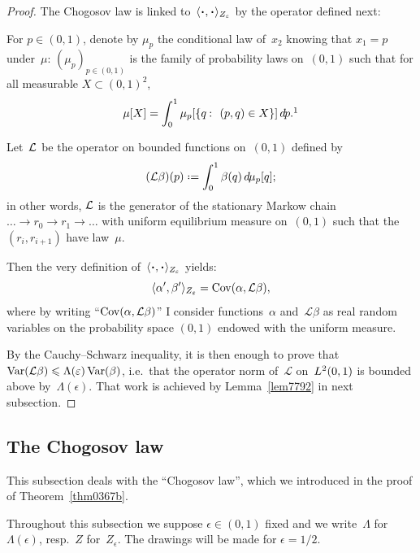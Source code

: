 \begin{proof}
The Chogosov law is linked to~$\langle\Bcdot,\Bcdot\rangle_{Z_{\epsilon}}$ by the operator defined next:
%
\begin{Def}
For $p\in(0,1)$, denote by $\mu_p$ the conditional law of~$x_2$ knowing that $x_1=p$ under~$\mu$:
$(\mu_p)_{p\in(0,1)}$ is the family of probability laws on~$(0,1)$ such that for all measurable $X\subset(0,1)^2$,
\[ \mu[X] = \int_0^1 \mu_p [\{q\colon (p,q)\in X\}] \,\dx{p} .\footnotemark\]
\end{Def}
%
\begin{Def}
Let~$\mathcal{L}$ be the operator on bounded functions on~$(0,1)$ defined by
\[ (\mcal{L}\beta)(p) \coloneqq \int_0^1 \beta(q) \,\dx{\mu_p}[q] ;\]
in other words, $\mathcal{L}$ is the generator of the stationary Markow chain
$\ldots \to r_0 \to r_1 \to \ldots$ with uniform equilibrium measure on~$(0,1)$
such that the $(r_i,r_{i+1})$ have law~$\mu$.
\end{Def}
%
\noindent Then the very definition of~$\langle\Bcdot,\Bcdot\rangle_{Z_{\epsilon}}$ yields:
\[ \langle\alpha',\beta'\rangle_{Z_{\varepsilon}} = \operatorname{Cov}(\alpha,\mathcal{L}\beta) ,\]
%
where by writing ``$\operatorname{Cov}(\alpha,\mathcal{L}\beta)$'' I consider
functions~$\alpha$ and~$\mathcal{L}\beta$ as real random variables
on the probability space $(0,1)$ endowed with the uniform measure.

By the Cauchy--Schwarz inequality,
it is then enough to prove that $\operatorname{Var}(\mathcal{L}\beta) \leqslant \Lambda(\varepsilon)\operatorname{Var}(\beta)$,
i.e.\ that the operator norm of~$\mathcal{L}$ on~$\ldb(0,1)$ is bounded above by~$\Lambda(\epsilon)$.
That work is achieved by Lemma~\ref{lem7792} in next subsection.
\end{proof}


\subsection{The Chogosov law}\label{parTheChogosovProcess}

This subsection deals with the ``Chogosov law'',
which we introduced in the proof of Theorem~\ref{thm0367b}.

\begin{NOTA}
Throughout this subsection we suppose $\epsilon\in(0,1)$ fixed
and we write~$\Lambda$ for~$\Lambda(\epsilon)$, resp.~$Z$ for~$Z_{\epsilon}$.
The drawings will be made for $\epsilon=1/2$.
\end{NOTA}

